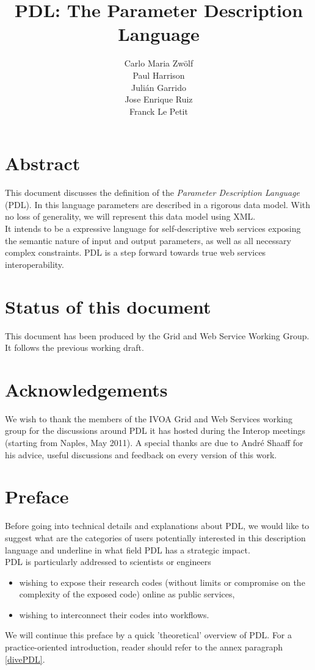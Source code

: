 \documentclass[a4paper,11pt] {ivoa}
\title{PDL: The Parameter Description Language}
\author{Carlo Maria Zw\"olf \\ Paul Harrison \\ Juli\'an Garrido \\ Jose Enrique Ruiz \\ Franck Le Petit}
\date{\pdldate}
\begin{document}
\maketitle
\section*{Abstract}
This document discusses the definition of the  {\it Parameter Description Language} (PDL). In this language parameters are described in a rigorous data model. With no loss of generality, we will represent this data model using XML.\\
It intends to be a expressive language for self-descriptive web services exposing the semantic nature of input and output parameters, as well as all necessary complex constraints. PDL is a step forward towards true web services interoperability. 
\section{Status of this document}
This document has been produced by the Grid and Web Service Working Group. It follows the previous working draft.
 
\section*{Acknowledgements}
We wish to thank the members of the IVOA Grid and Web Services working group for the discussions around PDL it has hosted during the Interop meetings (starting from Naples, May 2011). A special thanks are due to Andr\'e Shaaff for his advice, useful discussions and feedback on every version of this work.

\clearpage

\tableofcontents

\newpage

\section{Preface}
Before going into technical details and explanations about PDL, we would like to suggest what are the categories of users potentially interested in this description language and underline in what field PDL has a strategic impact.\\

\noindent PDL is particularly addressed to scientists or engineers
\begin{itemize}
\item wishing to expose their research codes (without limits or compromise on the complexity of the exposed code) online as public services,
\item wishing to interconnect their codes into workflows.
\end{itemize}
We will continue this preface by a quick 'theoretical' overview of PDL. For a practice-oriented introduction, reader should refer to the annex paragraph \ref{divePDL}.\\
\end{document}
